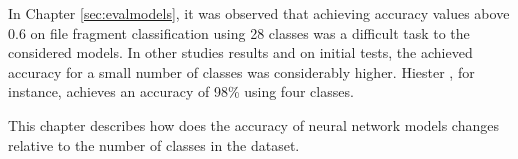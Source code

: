 In Chapter \ref{sec:evalmodels}, it was observed that achieving accuracy values above 0.6 on file fragment classification using 28 classes was a difficult task to the considered models. In other studies results \cite{hiester_file_2018} \cite{sportiello_context-based_2012} \cite{amirani_feature-based_2013} \cite{maslim_distributed_2014} and on initial tests, the achieved accuracy for a small number of classes was considerably higher. Hiester \cite{hiester_file_2018}, for instance, achieves an accuracy of 98\% using four classes.

This chapter describes how does the accuracy of neural network models changes relative to the number of classes in the dataset.

